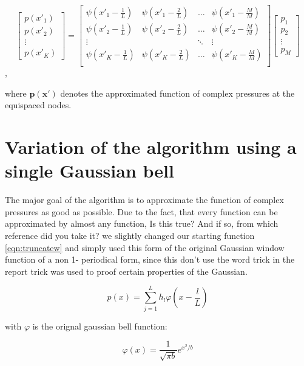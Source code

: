 \documentclass[11pt]{report} %
\begin{document}
\[
\begin{bmatrix}
	p(x'_1) \\
	p(x'_2) \\
	\vdots\\
	p(x'_K)
\end{bmatrix} = 
\begin{bmatrix}
    \psi(x'_{1}-\frac{1}{L})& \psi(x'_{1}-\frac{2}{L})& \dots & \psi(x'_{1}-\frac{M}{M}) \\
    \psi(x'_{2}-\frac{1}{L})& \psi(x'_{2}-\frac{2}{L})& \dots & \psi(x'_{2}-\frac{M}{M}) \\
    \vdots &  &\ddots & \vdots \\
    \psi(x'_{K}-\frac{1}{L})& \psi(x'_{K}-\frac{2}{L})& \dots & \psi(x'_{K}-\frac{M}{M}) \\   
\end{bmatrix}
\begin{bmatrix}
    p_1 \\
    p_2 \\
    \vdots \\
    p_{M}
\end{bmatrix}
\],

where $\bm{p(x')}$ denotes the approximated function of complex pressures at the equispaced nodes. 

\section{Variation of the algorithm using a single Gaussian bell}

The major goal of the algorithm is to approximate the function of complex pressures as good as possible.
Due to the fact, that every function can be approximated by almost any function, {\color{red} Is this true? And if so, from which reference did you take it?} we slightly changed our starting function \eqref{eqn:truncatew} and simply used this form of the original Gaussian window function of a non 1- periodical form, since this {\color{red} don't use the word trick in the report} trick was used to proof certain properties of the Gaussian.
  
\begin{equation}
 p(x)=\sum\limits_{j=1}^L h_{l}\varphi(x-\frac{l}{L})
\end{equation}

with $\varphi$ is the orignal gaussian bell function: 

\begin{equation}
\varphi(x)= \frac{1}{\sqrt{\pi b}}  e^{x^2/b}
\end{equation}
\end{document}
